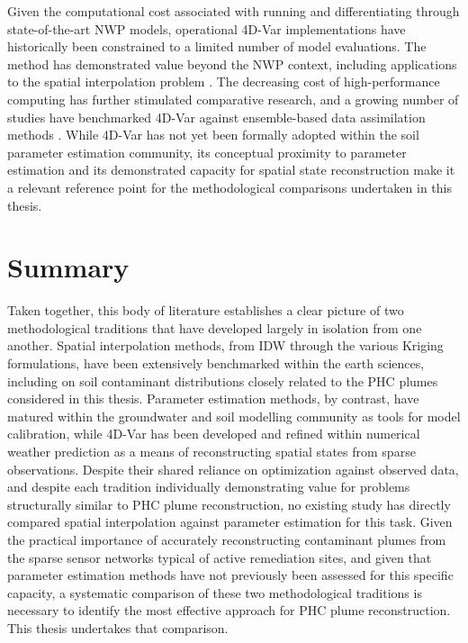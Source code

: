 Given the computational cost associated with running and differentiating through state-of-the-art NWP models, operational 4D-Var implementations have historically been constrained to a limited number of model evaluations. The method has demonstrated value beyond the NWP context, including applications to the spatial interpolation problem \cite{fdvar_interpolation}. The decreasing cost of high-performance computing has further stimulated comparative research, and a growing number of studies have benchmarked 4D-Var against ensemble-based data assimilation methods \cite{fdvar_vs_ensemble,lorenc2003potential,bannister2017review}. While 4D-Var has not yet been formally adopted within the soil parameter estimation community, its conceptual proximity to parameter estimation and its demonstrated capacity for spatial state reconstruction make it a relevant reference point for the methodological comparisons undertaken in this thesis.

\section{Summary}
\label{sec:lit_review_summary}

Taken together, this body of literature establishes a clear picture of two methodological traditions that have developed largely in isolation from one another. Spatial interpolation methods, from IDW through the various Kriging formulations, have been extensively benchmarked within the earth sciences, including on soil contaminant distributions closely related to the PHC plumes considered in this thesis. Parameter estimation methods, by contrast, have matured within the groundwater and soil modelling community as tools for model calibration, while 4D-Var has been developed and refined within numerical weather prediction as a means of reconstructing spatial states from sparse observations. Despite their shared reliance on optimization against observed data, and despite each tradition individually demonstrating value for problems structurally similar to PHC plume reconstruction, no existing study has directly compared spatial interpolation against parameter estimation for this task. Given the practical importance of accurately reconstructing contaminant plumes from the sparse sensor networks typical of active remediation sites, and given that parameter estimation methods have not previously been assessed for this specific capacity, a systematic comparison of these two methodological traditions is necessary to identify the most effective approach for PHC plume reconstruction. This thesis undertakes that comparison.